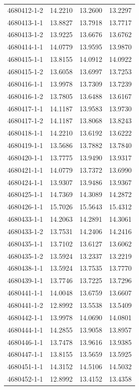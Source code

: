 \begin{longtable}{lrrr}
4680412-1-2 & 14.2210 & 13.2600 & 13.2297 \\
4680413-1-1 & 13.8827 & 13.7918 & 13.7717 \\
4680413-1-2 & 13.9225 & 13.6676 & 13.6762 \\
4680414-1-1 & 14.0779 & 13.9595 & 13.9870 \\
4680415-1-1 & 13.8155 & 14.0912 & 14.0922 \\
4680415-1-2 & 13.6058 & 13.6997 & 13.7253 \\
4680416-1-1 & 13.9978 & 13.7309 & 13.7239 \\
4680416-1-2 & 13.7805 & 13.6488 & 13.6167 \\
4680417-1-1 & 14.1187 & 13.9583 & 13.9730 \\
4680417-1-2 & 14.1187 & 13.8068 & 13.8243 \\
4680418-1-1 & 14.2210 & 13.6192 & 13.6222 \\
4680419-1-1 & 13.5686 & 13.7882 & 13.7840 \\
4680420-1-1 & 13.7775 & 13.9490 & 13.9317 \\
4680421-1-1 & 14.0779 & 13.7372 & 13.6990 \\
4680424-1-1 & 13.9307 & 13.9486 & 13.9367 \\
4680425-1-1 & 14.7369 & 14.3089 & 14.2872 \\
4680426-1-1 & 15.7026 & 15.5643 & 15.4312 \\
4680433-1-1 & 14.2063 & 14.2891 & 14.3061 \\
4680433-1-2 & 13.7531 & 14.2406 & 14.2416 \\
4680435-1-1 & 13.7102 & 13.6127 & 13.6062 \\
4680435-1-2 & 13.5924 & 13.2337 & 13.2219 \\
4680438-1-1 & 13.5924 & 13.7535 & 13.7770 \\
4680439-1-1 & 13.7746 & 13.7225 & 13.7296 \\
4680441-1-1 & 14.0048 & 13.6759 & 13.6607 \\
4680441-1-2 & 12.8992 & 13.5538 & 13.5409 \\
4680442-1-1 & 13.9978 & 14.0690 & 14.0801 \\
4680444-1-1 & 14.2855 & 13.9058 & 13.8957 \\
4680446-1-1 & 13.7478 & 13.9616 & 13.9385 \\
4680447-1-1 & 13.8155 & 13.5659 & 13.5925 \\
4680451-1-1 & 14.3152 & 14.5106 & 14.5032 \\
4680452-1-1 & 12.8992 & 13.4152 & 13.4358 \\

\end{longtable}
